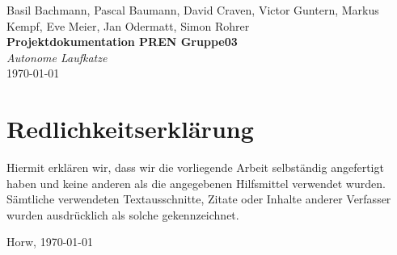 \documentclass[a4paper]{report}
\newcommand*{\titleAP}{\begingroup %
	\centering
	\vspace*{\baselineskip} %

	{Basil Bachmann, Pascal Baumann, David Craven, Victor Guntern, Markus Kempf, Eve Meier, Jan Odermatt, Simon Rohrer}\\[0.167\textheight] %

	{\Huge\bfseries Projektdokumentation PREN Gruppe03}\\[\baselineskip]

	{\Large \textit{Autonome Laufkatze}}\\
	\today

	\vspace*{3\baselineskip} %
	\endgroup}
\begin{document}

\titleAP

\newpage

\chapter*{Redlichkeitserklärung}
\label{ch*:Redlich}
Hiermit erklären wir, dass wir die vorliegende Arbeit selbständig angefertigt haben und keine anderen als die angegebenen Hilfsmittel verwendet wurden. Sämtliche verwendeten Textausschnitte, Zitate oder Inhalte anderer Verfasser wurden ausdrücklich als solche gekennzeichnet.

\vspace{1.5em}

\noindent
Horw, \today

\vspace{2em}
\end{document}
